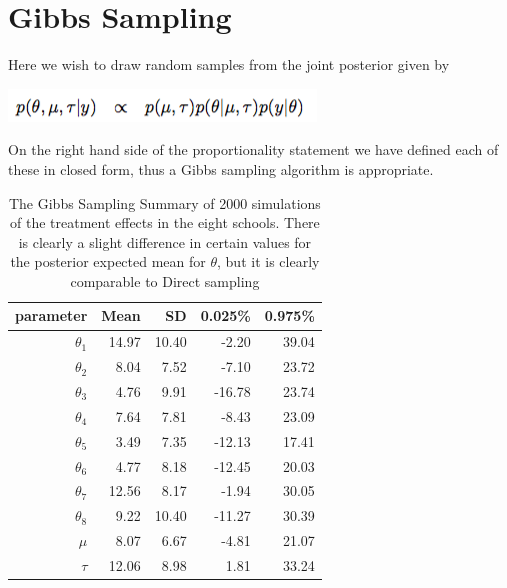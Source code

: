 \documentclass[a4paper, 9pt]{article}
\begin{document}
\section{Gibbs Sampling}
Here we wish to draw random samples from the joint posterior given by
\begin{center}
    \includegraphics[scale =0.55]{jointPost.png}
\end{center}
On the right hand side of the proportionality statement we have defined each of these in closed form, thus a Gibbs sampling algorithm is appropriate. 
\begin{table}[ht]
\centering
\label{gibbstab}
\caption{The Gibbs Sampling Summary of 2000 simulations of the treatment effects in the eight schools. There is clearly a slight difference in certain values for the posterior expected mean for $\theta$, but it is clearly comparable to Direct sampling}

\begin{tabular}{rrrrr}
  \hline
parameter & Mean & SD & 0.025\% & 0.975\% \\ 
  \hline
$\theta_1$ & 14.97 & 10.40 & -2.20 & 39.04 \\ 
  $\theta_2$ & 8.04 & 7.52 & -7.10 & 23.72 \\ 
  $\theta_3$ & 4.76 & 9.91 & -16.78 & 23.74 \\ 
  $\theta_4$ & 7.64 & 7.81 & -8.43 & 23.09 \\ 
  $\theta_5$ & 3.49 & 7.35 & -12.13 & 17.41 \\ 
  $\theta_6$ & 4.77 & 8.18 & -12.45 & 20.03 \\ 
  $\theta_7$ & 12.56 & 8.17 & -1.94 & 30.05 \\ 
  $\theta_8$ & 9.22 & 10.40 & -11.27 & 30.39 \\
  $\mu$ & 8.07 & 6.67 & -4.81 & 21.07 \\ 
  $\tau$ & 12.06 & 8.98 & 1.81 & 33.24 \\ 
   \hline
\end{tabular}
\end{table}
\end{document}

